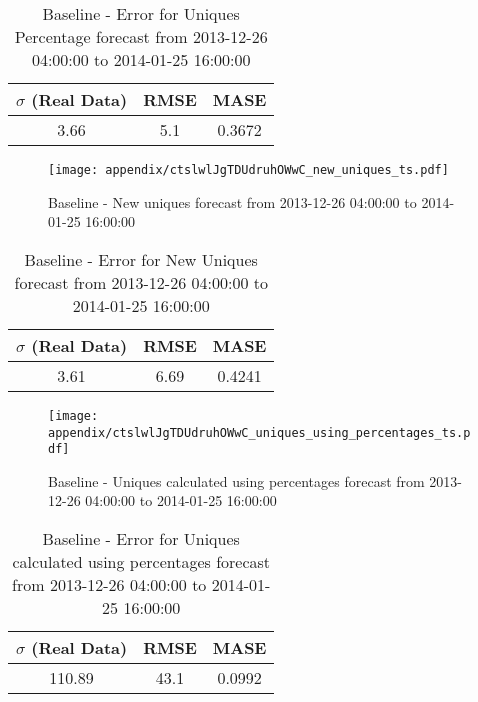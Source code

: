 \begin{table}[H]
\centering
\footnotesize
\begin{tabular}{ccc}
$\sigma$ (Real Data) & RMSE & MASE   \\ \hline
3.66 & 5.1 & 0.3672 \\
\end{tabular}

\vspace{0.5cm}

\caption{
Baseline - Error for Uniques Percentage forecast from 2013-12-26 04:00:00 to 2014-01-25 16:00:00}
\end{table}

\begin{figure}[H] \begin{center} \leavevmode
\texttt{[image: appendix/ctslwlJgTDUdruhOWwC\_new\_uniques\_ts.pdf]} \caption{
Baseline - New uniques forecast from 2013-12-26 04:00:00 to 2014-01-25 16:00:00} \label{fig:appendix/ctslwlJgTDUdruhOWwC_new_uniques_ts.pdf} \end{center}
\end{figure}

\begin{table}[H]
\centering
\footnotesize
\begin{tabular}{ccc}
$\sigma$ (Real Data) & RMSE & MASE   \\ \hline
3.61 & 6.69 & 0.4241 \\
\end{tabular}

\vspace{0.5cm}

\caption{
Baseline - Error for New Uniques forecast from 2013-12-26 04:00:00 to 2014-01-25 16:00:00}
\end{table}

\begin{figure}[H] \begin{center} \leavevmode
\texttt{[image: appendix/ctslwlJgTDUdruhOWwC\_uniques\_using\_percentages\_ts.pdf]} \caption{
Baseline - Uniques calculated using percentages forecast from 2013-12-26 04:00:00 to 2014-01-25 16:00:00} \label{fig:appendix/ctslwlJgTDUdruhOWwC_uniques_using_percentages_ts.pdf} \end{center}
\end{figure}

\begin{table}[H]
\centering
\footnotesize
\begin{tabular}{ccc}
$\sigma$ (Real Data) & RMSE & MASE   \\ \hline
110.89 & 43.1 & 0.0992 \\
\end{tabular}

\vspace{0.5cm}

\caption{
Baseline - Error for Uniques calculated using percentages forecast from 2013-12-26 04:00:00 to 2014-01-25 16:00:00}
\end{table}


